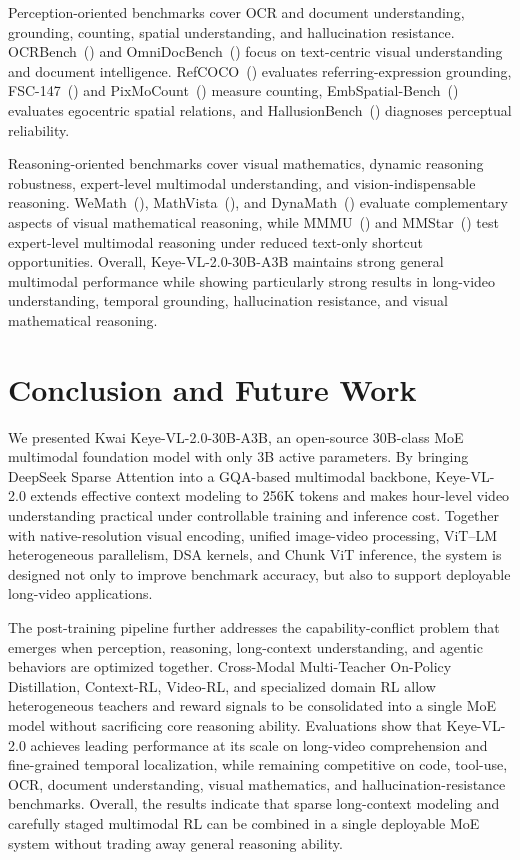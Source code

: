 \documentclass{llmxive}
\begin{document}
Perception-oriented benchmarks cover OCR and document understanding, grounding, counting, spatial understanding, and hallucination resistance. OCRBench~(\cite{ocrbench}) and OmniDocBench~(\cite{omnidocbench}) focus on text-centric visual understanding and document intelligence. RefCOCO~(\cite{refcoco}) evaluates referring-expression grounding, FSC-147~(\cite{fsc_147}) and PixMoCount~(\cite{pixmo}) measure counting, EmbSpatial-Bench~(\cite{embspatialbench}) evaluates egocentric spatial relations, and HallusionBench~(\cite{hallusionbench}) diagnoses perceptual reliability.

Reasoning-oriented benchmarks cover visual mathematics, dynamic reasoning robustness, expert-level multimodal understanding, and vision-indispensable reasoning. WeMath~(\cite{wemath}), MathVista~(\cite{mathvista}), and DynaMath~(\cite{dynamath}) evaluate complementary aspects of visual mathematical reasoning, while MMMU~(\cite{mmmu}) and MMStar~(\cite{mm_star}) test expert-level multimodal reasoning under reduced text-only shortcut opportunities. Overall, Keye-VL-2.0-30B-A3B maintains strong general multimodal performance while showing particularly strong results in long-video understanding, temporal grounding, hallucination resistance, and visual mathematical reasoning.



\section{Conclusion and Future Work}

We presented Kwai Keye-VL-2.0-30B-A3B, an open-source 30B-class MoE multimodal foundation model with only 3B active parameters. By bringing DeepSeek Sparse Attention into a GQA-based multimodal backbone, Keye-VL-2.0 extends effective context modeling to 256K tokens and makes hour-level video understanding practical under controllable training and inference cost. Together with native-resolution visual encoding, unified image-video processing, ViT--LM heterogeneous parallelism, DSA kernels, and Chunk ViT inference, the system is designed not only to improve benchmark accuracy, but also to support deployable long-video applications.

The post-training pipeline further addresses the capability-conflict problem that emerges when perception, reasoning, long-context understanding, and agentic behaviors are optimized together. Cross-Modal Multi-Teacher On-Policy Distillation, Context-RL, Video-RL, and specialized domain RL allow heterogeneous teachers and reward signals to be consolidated into a single MoE model without sacrificing core reasoning ability. Evaluations show that Keye-VL-2.0 achieves leading performance at its scale on long-video comprehension and fine-grained temporal localization, while remaining competitive on code, tool-use, OCR, document understanding, visual mathematics, and hallucination-resistance benchmarks. Overall, the results indicate that sparse long-context modeling and carefully staged multimodal RL can be combined in a single deployable MoE system without trading away general reasoning ability.
\end{document}
